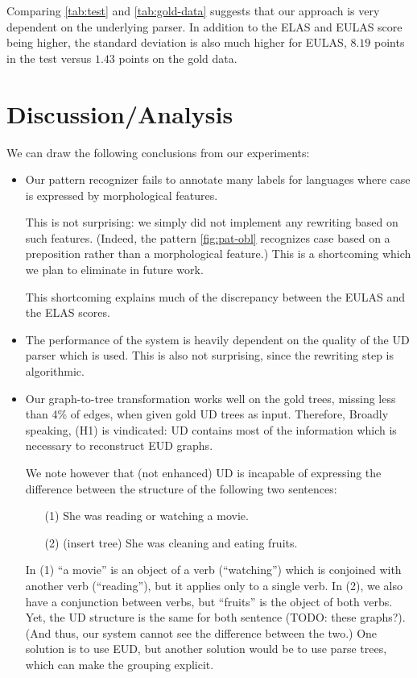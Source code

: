 \documentclass[11pt,a4paper]{article}
\begin{document}
Comparing \cref{tab:test} and \cref{tab:gold-data} suggests
that our approach is very dependent on the underlying parser. In
addition to the ELAS and EULAS score being higher, the standard
deviation is also much higher for EULAS, $8.19$ points in the test
versus $1.43$ points on the gold data.

\section{Discussion/Analysis}

We can draw the following conclusions from our experiments:

\begin{itemize}
\item
  Our pattern recognizer fails to annotate many labels
  for languages where case is expressed by morphological features.
  
  This is not surprising: we simply did not implement any rewriting
  based on such features. (Indeed, the pattern \cref{fig:pat-obl}
  recognizes case based on a preposition rather than a morphological
  feature.) This is a shortcoming which we plan to eliminate in future
  work.

  This shortcoming explains much of the discrepancy between the EULAS
  and the ELAS scores.
\item The performance of the system is heavily dependent on the
  quality of the UD parser which is used. This is also not surprising,
  since the rewriting step is algorithmic.

\item Our graph-to-tree transformation works well on the gold trees,
  missing less than 4\% of edges, when given gold UD trees as input.
  Therefore, Broadly speaking, (H1) is vindicated: UD contains most of
  the information which is necessary to reconstruct EUD graphs.

  We note however that (not enhanced) UD is incapable of expressing
  the difference between the structure of the following two sentences:
  
  \begin{itemize}
  \item[(1)] She was reading or watching a movie.
  \item[(2)] (insert tree) She was cleaning and eating fruits.
  \end{itemize}
  In (1) ``a movie'' is an object of a verb (``watching'') which is
  conjoined with another verb (``reading''), but it applies only to a
  single verb. In (2), we also have a conjunction between verbs, but
  ``fruits'' is the object of both verbs. Yet, the UD structure is the
  same for both sentence (TODO: these graphs?).  (And thus, our system
  cannot see the difference between the two.)  One solution is to use
  EUD, but another solution would be to use parse trees, which can
  make the grouping explicit.


\end{itemize}
\end{document}
